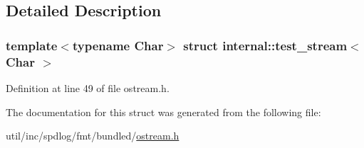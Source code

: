 \subsection{Detailed Description}
\subsubsection*{template$<$typename Char$>$\newline
struct internal\+::test\+\_\+stream$<$ Char $>$}



Definition at line 49 of file ostream.\+h.



The documentation for this struct was generated from the following file\+:\begin{DoxyCompactItemize}
\item 
util/inc/spdlog/fmt/bundled/\hyperlink{ostream_8h}{ostream.\+h}\end{DoxyCompactItemize}
